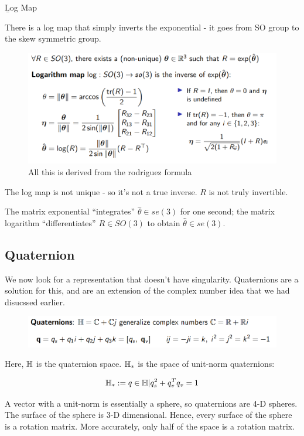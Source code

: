 \b{Log Map}

There is a log map that simply inverts the exponential - it goes from SO group to the skew symmetric group.

\begin{figure}[h]\centering\includegraphics[width=12cm]{img/j_3_18.png}\caption{All this is derived from the rodriguez formula}\end{figure}

The log map is not unique - so it's not a true inverse. $R$ is not truly invertible.

The matrix exponential ``integrates'' $\hat{\theta} \in se(3)$ for one second; the matrix logarithm ``differentiates'' $R \in SO(3)$ to obtain $\hat{\theta} \in se(3)$.

\subsection{Quaternion}

We now look for a representation that doesn't have singularity. Quaternions are a solution for this, and are an extension of the complex number idea that we had disucssed earlier. 

\begin{figure}[h]\centering\includegraphics[width=12cm]{img/j_3_19.png}\end{figure}

Here, $\mathbb{H}$ is the quaternion space. $\mathbb{H}_*$ is the space of unit-norm quaternions:

\begin{equation*}
    \mathbb{H}_* := {q\in \mathbb{H} | q_s^2 + q_v^Tq_v = 1}
\end{equation*}

A vector with a unit-norm is essentially a sphere, so quaternions are 4-D spheres. The surface of the sphere is 3-D dimensional. Hence, every surface of the sphere is a rotation matrix. More accurately, only half of the space is a rotation matrix.

